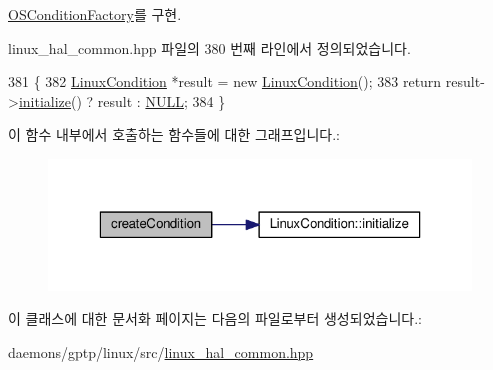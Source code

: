 \hyperlink{class_o_s_condition_factory_ae6df40a45107121057308cf71875f7f4}{O\+S\+Condition\+Factory}를 구현.



linux\+\_\+hal\+\_\+common.\+hpp 파일의 380 번째 라인에서 정의되었습니다.


\begin{DoxyCode}
381     \{
382         \hyperlink{class_linux_condition}{LinuxCondition} *result = \textcolor{keyword}{new} \hyperlink{class_linux_condition}{LinuxCondition}();
383         \textcolor{keywordflow}{return} result->\hyperlink{class_linux_condition_ab3e7cc706c522b3231f9156bba461436}{initialize}() ? result : \hyperlink{openavb__types__base__pub_8h_a070d2ce7b6bb7e5c05602aa8c308d0c4}{NULL};
384     \}
\end{DoxyCode}


이 함수 내부에서 호출하는 함수들에 대한 그래프입니다.\+:
\nopagebreak
\begin{figure}[H]
\begin{center}
\leavevmode
\includegraphics[width=323pt]{class_linux_condition_factory_a148d6959f334e717f2ec8b948bfe29c5_cgraph}
\end{center}
\end{figure}




이 클래스에 대한 문서화 페이지는 다음의 파일로부터 생성되었습니다.\+:\begin{DoxyCompactItemize}
\item 
daemons/gptp/linux/src/\hyperlink{linux__hal__common_8hpp}{linux\+\_\+hal\+\_\+common.\+hpp}\end{DoxyCompactItemize}

